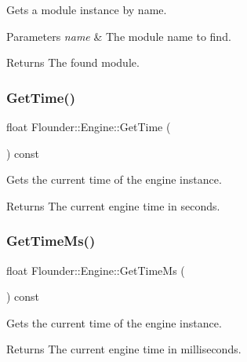 Gets a module instance by name. 


\begin{DoxyParams}{Parameters}
{\em name} & The module name to find. \\
\hline
\end{DoxyParams}
\begin{DoxyReturn}{Returns}
The found module. 
\end{DoxyReturn}
\mbox{\label{class_flounder_1_1_engine_a86c953aca3f5b7ec61f124e4f4a29489}} 
\subsubsection{\texorpdfstring{Get\+Time()}{GetTime()}}
{\footnotesize\ttfamily float Flounder\+::\+Engine\+::\+Get\+Time (\begin{DoxyParamCaption}{ }\end{DoxyParamCaption}) const\hspace{0.3cm}{\ttfamily [inline]}}



Gets the current time of the engine instance. 

\begin{DoxyReturn}{Returns}
The current engine time in seconds. 
\end{DoxyReturn}
\mbox{\label{class_flounder_1_1_engine_a9a356f09dea9c9ae0fbd2e512c9517f8}} 
\subsubsection{\texorpdfstring{Get\+Time\+Ms()}{GetTimeMs()}}
{\footnotesize\ttfamily float Flounder\+::\+Engine\+::\+Get\+Time\+Ms (\begin{DoxyParamCaption}{ }\end{DoxyParamCaption}) const\hspace{0.3cm}{\ttfamily [inline]}}



Gets the current time of the engine instance. 

\begin{DoxyReturn}{Returns}
The current engine time in milliseconds. 
\end{DoxyReturn}
\mbox{\label{class_flounder_1_1_engine_a0602fd055a84457207c076ae3f221ffe}} 
